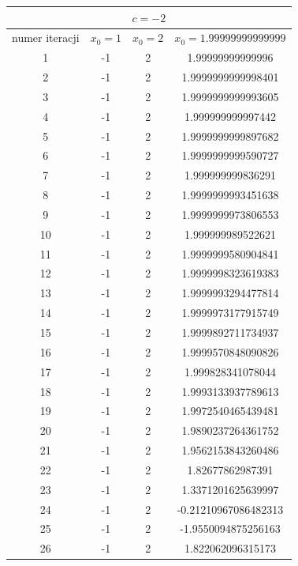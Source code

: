 \documentclass[]{article}
\begin{document}
	
	\begin{table}[!h]
		\centering
		\label{tab:table1}
		\begin{tabular}{|c|c|c|c|}
			\multicolumn{4}{c}{$c = -2$} \\
			\hline
			numer iteracji & $x_0 = 1$ & $x_0 = 2$ & $x_0 = 1.99999999999999$\\
			\hline
			1 & -1 &	 2 &	 1.99999999999996 \\ \hline
			2 & -1 &	 2 &	 1.9999999999998401 \\ \hline
			3 & -1 &	 2 &	 1.9999999999993605 \\ \hline
			4 & -1 &	 2 &	 1.999999999997442 \\ \hline
			5 & -1 &	 2 &	 1.9999999999897682 \\ \hline
			6 & -1 &	 2 &	 1.9999999999590727 \\ \hline
			7 & -1 &	 2 &	 1.999999999836291 \\ \hline
			8 & -1 &	 2 &	 1.9999999993451638 \\ \hline
			9 & -1 &	 2 &	 1.9999999973806553 \\ \hline
			10 & -1 &	 2 &	 1.999999989522621 \\ \hline
			11 & -1 &	 2 &	 1.9999999580904841 \\ \hline
			12 & -1 &	 2 &	 1.9999998323619383 \\ \hline
			13 & -1 &	 2 &	 1.9999993294477814 \\ \hline
			14 & -1 &	 2 &	 1.9999973177915749 \\ \hline
			15 & -1 &	 2 &	 1.9999892711734937 \\ \hline
			16 & -1 &	 2 &	 1.9999570848090826 \\ \hline
			17 & -1 &	 2 &	 1.999828341078044 \\ \hline
			18 & -1 &	 2 &	 1.9993133937789613 \\ \hline
			19 & -1 &	 2 &	 1.9972540465439481 \\ \hline
			20 & -1 &	 2 &	 1.9890237264361752 \\ \hline
			21 & -1 &	 2 &	 1.9562153843260486 \\ \hline
			22 & -1 &	 2 &	 1.82677862987391 \\ \hline
			23 & -1 &	 2 &	 1.3371201625639997 \\ \hline
			24 & -1 &	 2 &	 -0.21210967086482313 \\ \hline
			25 & -1 &	 2 &	 -1.9550094875256163 \\ \hline
			26 & -1 &	 2 &	 1.822062096315173 \\ \hline

\end{tabular}
\end{table}
\end{document}
